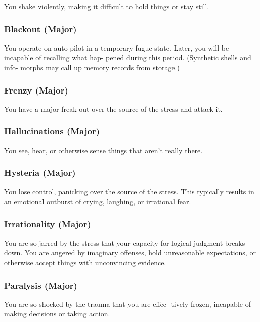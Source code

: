 You shake violently, making it difficult to hold things 
or stay still.

\subsubsection{Blackout (Major)}

You operate on auto-pilot in a temporary fugue state. 
Later, you will be incapable of recalling what hap-
pened during this period. (Synthetic shells and info-
morphs may call up memory records from storage.)

\subsubsection{Frenzy (Major)}

You have a major freak out over the source of the 
stress and attack it.

\subsubsection{Hallucinations (Major)}

You see, hear, or otherwise sense things that aren't 
really there.

\subsubsection{Hysteria (Major)}

You lose control, panicking over the source of the 
stress. This typically results in an emotional outburst 
of crying, laughing, or irrational fear.

\subsubsection{Irrationality (Major)}

You are so jarred by the stress that your capacity for 
logical judgment breaks down. You are angered by 
imaginary offenses, hold unreasonable expectations, or 
otherwise accept things with unconvincing evidence.

\subsubsection{Paralysis (Major)}

You are so shocked by the trauma that you are effec-
tively frozen, incapable of making decisions or taking 
action.

